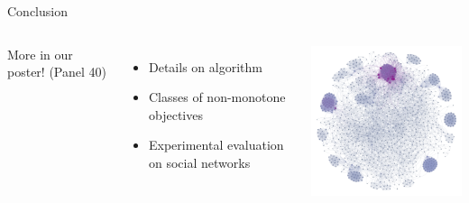 \documentclass[xetex,10pt,mathserif]{beamer}
\begin{document}
\begin{frame}{Conclusion}
\begin{columns}[c]
{\large More in our poster! (Panel 40)}
\vspace{2em}
\begin{itemize}
\item Details on algorithm
\vspace{1.5em}
\item Classes of non-monotone objectives
\vspace{1.5em}
\item Experimental evaluation on social networks
\end{itemize}
\includegraphics[width=2.9in]{figures/graph_white.png}
\end{columns}
\end{frame}
\end{document}
